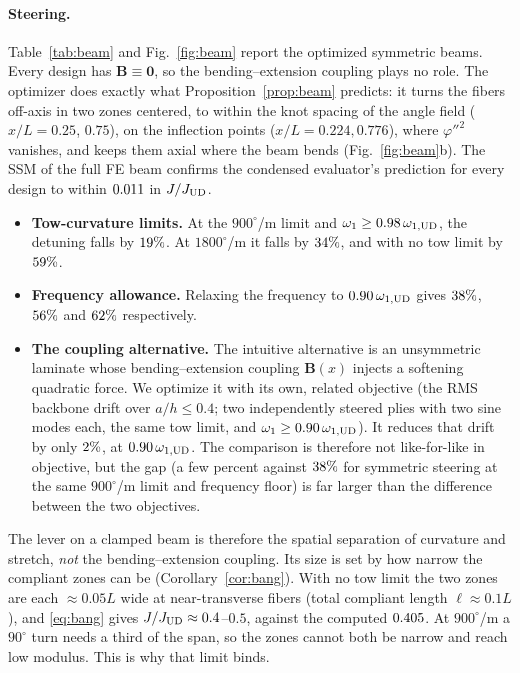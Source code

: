 \paragraph{Steering.} Table~\ref{tab:beam} and Fig.~\ref{fig:beam} report the optimized
symmetric beams. Every design has $\bm B\equiv\bm 0$, so the bending--extension
coupling plays no role. The optimizer does exactly what Proposition~\ref{prop:beam}
predicts: it turns the fibers off-axis in two zones centered, to within the knot spacing of the
angle field ($x/L=0.25$, $0.75$), on the inflection points ($x/L=0.224,0.776$), where $\varphi''^2$ vanishes, and keeps them axial where the beam
bends (Fig.~\ref{fig:beam}b). The SSM of the full FE beam confirms the condensed
evaluator's prediction for every design to within $0.011$ in $J/J_{\mathrm{UD}}$.
\begin{itemize}[itemsep=1pt]
\item \textbf{Tow-curvature limits.} At the $900^\circ$/m limit and $\omega_1\ge0.98\,
  \omega_{1,\mathrm{UD}}$, the detuning falls by $19\%$. At $1800^\circ$/m it falls
  by $34\%$, and with no tow limit by $59\%$.
\item \textbf{Frequency allowance.} Relaxing the frequency to $0.90\,\omega_{1,\mathrm{UD}}$ gives
  $38\%$, $56\%$ and $62\%$ respectively.
\item \textbf{The coupling alternative.} The intuitive alternative is an unsymmetric
  laminate whose bending--extension coupling $\bm B(x)$ injects a softening quadratic
  force. We optimize it with its own, related objective (the RMS backbone drift over
  $a/h\le0.4$; two independently steered plies with two sine modes each, the same tow
  limit, and $\omega_1\ge0.90\,\omega_{1,\mathrm{UD}}$). It reduces that drift by only
  $2\%$, at $0.90\,\omega_{1,\mathrm{UD}}$. The comparison is therefore not like-for-like in
  objective, but the gap (a few percent against $38\%$ for symmetric steering at the same $900^\circ$/m limit and frequency floor) is far larger than the
  difference between the two objectives.
\end{itemize}
The lever on a clamped beam is therefore the spatial separation of curvature and
stretch, \emph{not} the bending--extension coupling. Its size is set by how narrow the
compliant zones can be (Corollary~\ref{cor:bang}). With no tow limit the two zones are each
$\approx0.05L$ wide at near-transverse fibers (total compliant length $\ell\approx0.1L$), and
\eqref{eq:bang} gives
$J/J_{\mathrm{UD}}\approx0.4$--$0.5$, against the computed $0.405$. At $900^\circ$/m a
$90^\circ$ turn needs a third of the span, so the zones cannot both be narrow and
reach low modulus. This is why that limit binds.

